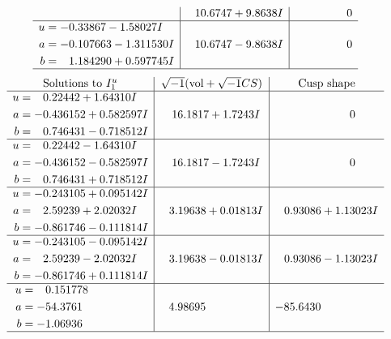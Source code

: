 \documentclass[1p]{elsarticle_modified}
\theoremstyle{definition}
\newcommand{\I}{\sqrt{-1}}
\begin{document}
$$\begin{array}{c|c|c}
 & \phantom{-}10.6747 + 9.8638 I & \phantom{-0.000000 } 0 \\ \hline\begin{aligned}
u &= -0.33867 - 1.58027 I \\
a &= -0.107663 - 1.311530 I \\
b &= \phantom{-}1.184290 + 0.597745 I\end{aligned}
 & \phantom{-}10.6747 - 9.8638 I & \phantom{-0.000000 } 0\\
 \hline 
 \end{array}$$\newpage$$\begin{array}{c|c|c}  
\text{Solutions to }I^u_{1}& \I (\text{vol} + \sqrt{-1}CS) & \text{Cusp shape}\\
 \hline 
\begin{aligned}
u &= \phantom{-}0.22442 + 1.64310 I \\
a &= -0.436152 + 0.582597 I \\
b &= \phantom{-}0.746431 - 0.718512 I\end{aligned}
 & \phantom{-}16.1817 + 1.7243 I & \phantom{-0.000000 } 0 \\ \hline\begin{aligned}
u &= \phantom{-}0.22442 - 1.64310 I \\
a &= -0.436152 - 0.582597 I \\
b &= \phantom{-}0.746431 + 0.718512 I\end{aligned}
 & \phantom{-}16.1817 - 1.7243 I & \phantom{-0.000000 } 0 \\ \hline\begin{aligned}
u &= -0.243105 + 0.095142 I \\
a &= \phantom{-}2.59239 + 2.02032 I \\
b &= -0.861746 - 0.111814 I\end{aligned}
 & \phantom{-}3.19638 + 0.01813 I & \phantom{-}0.93086 + 1.13023 I \\ \hline\begin{aligned}
u &= -0.243105 - 0.095142 I \\
a &= \phantom{-}2.59239 - 2.02032 I \\
b &= -0.861746 + 0.111814 I\end{aligned}
 & \phantom{-}3.19638 - 0.01813 I & \phantom{-}0.93086 - 1.13023 I \\ \hline\begin{aligned}
u &= \phantom{-}0.151778\phantom{ +0.000000I} \\
a &= -54.3761\phantom{ +0.000000I} \\
b &= -1.06936\phantom{ +0.000000I}\end{aligned}
 & \phantom{-}4.98695\phantom{ +0.000000I} & -85.6430\phantom{ +0.000000I}\\
 \hline 
 \end{array}$$\newpage\newpage\renewcommand{\arraystretch}{1}
\end{document}
